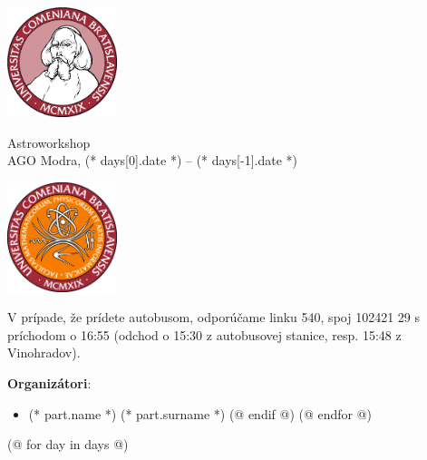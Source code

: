\documentclass[a4paper]{report}
\begin{document}
    \begin{minipage}{\textwidth}
        \begin{minipage}{0.2\textwidth}
            \includegraphics[width=32mm]{input/logo.jpg}
        \end{minipage}
        \begin{minipage}{0.58\textwidth}
            \centering
            \fontsize{40}{50}\selectfont
            Astroworkshop\\
            \Large
            AGO Modra, (* days[0].date *) -- (* days[-1].date *)
        \end{minipage}
        \begin{minipage}{0.2\textwidth}
            \includegraphics[width=32mm]{input/fmfi.png}
        \end{minipage}
    \end{minipage}
    \vspace*{10mm}

    V prípade, že prídete autobusom, odporúčame linku 540, spoj 102421 29 s príchodom o 16:55
    (odchod o 15:30 z autobusovej stanice, resp. 15:48 z Vinohradov).

    \textbf{Organizátori}:
    \begin{itemize}[itemsep=0mm]
    (@ for part in participants @)
        (@ if part.org @)
            \item (* part.name *) (* part.surname *)
        (@ endif @)
    (@ endfor @)
    \end{itemize}

    (@ for day in days @)
\end{document}

